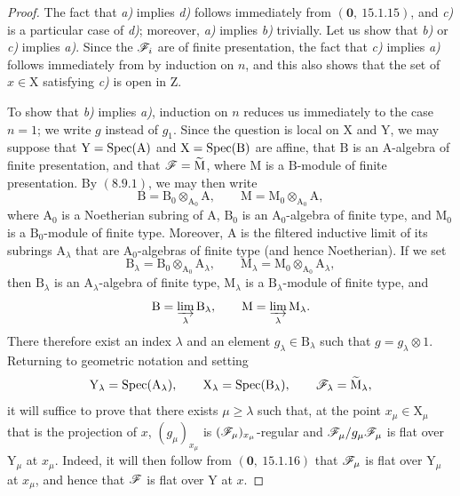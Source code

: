 \begin{proof}
The fact that \emph{a)} implies \emph{d)} follows immediately from $(\mathbf{0},~15.1.15)$, and \emph{c)} is a particular case of \emph{d)}; moreover, \emph{a)} implies \emph{b)} trivially. Let us show that \emph{b)} or \emph{c)} implies \emph{a)}. Since the $\mathscr{F}_i$ are of finite presentation, the fact that \emph{c)} implies \emph{a)} follows immediately from  by induction on $n$, and this also shows that the set of $x\in\mathrm{X}$ satisfying \emph{c)} is open in $\mathrm{Z}$.

To show that \emph{b)} implies \emph{a)}, induction on $n$ reduces us immediately to the case $n=1$; we write $g$ instead of $g_1$. Since the question is local on $\mathrm{X}$ and $\mathrm{Y}$, we may suppose that $\mathrm{Y}=\operatorname{Spec}(\mathrm{A})$ and $\mathrm{X}=\operatorname{Spec}(\mathrm{B})$ are affine, that $\mathrm{B}$ is an $\mathrm{A}$-algebra of finite presentation, and that $\mathscr{F}=\widetilde{\mathrm{M}}$, where $\mathrm{M}$ is a $\mathrm{B}$-module of finite presentation. By $(8.9.1)$, we may then write
\[
  \mathrm{B}=\mathrm{B}_0\otimes_{\mathrm{A}_0}\mathrm{A},
  \qquad
  \mathrm{M}=\mathrm{M}_0\otimes_{\mathrm{A}_0}\mathrm{A},
\]
where $\mathrm{A}_0$ is a Noetherian subring of $\mathrm{A}$, $\mathrm{B}_0$ is an $\mathrm{A}_0$-algebra of finite type, and $\mathrm{M}_0$ is a $\mathrm{B}_0$-module of finite type. Moreover, $\mathrm{A}$ is the filtered inductive limit of its subrings $\mathrm{A}_\lambda$ that are $\mathrm{A}_0$-algebras of finite type (and hence Noetherian). If we set
\[
  \mathrm{B}_\lambda=\mathrm{B}_0\otimes_{\mathrm{A}_0}\mathrm{A}_\lambda,
  \qquad
  \mathrm{M}_\lambda=\mathrm{M}_0\otimes_{\mathrm{A}_0}\mathrm{A}_\lambda,
\]
then $\mathrm{B}_\lambda$ is an $\mathrm{A}_\lambda$-algebra of finite type, $\mathrm{M}_\lambda$ is a $\mathrm{B}_\lambda$-module of finite type, and
\[
  \mathrm{B}=\varinjlim_\lambda\mathrm{B}_\lambda,
  \qquad
  \mathrm{M}=\varinjlim_\lambda\mathrm{M}_\lambda.
\]
There therefore exist an index $\lambda$ and an element $g_\lambda\in\mathrm{B}_\lambda$ such that $g=g_\lambda\otimes 1$. Returning to geometric notation and setting
\[
  \mathrm{Y}_\lambda=\operatorname{Spec}(\mathrm{A}_\lambda),
  \qquad
  \mathrm{X}_\lambda=\operatorname{Spec}(\mathrm{B}_\lambda),
  \qquad
  \mathscr{F}_\lambda=\widetilde{\mathrm{M}}_\lambda,
\]
it will suffice to prove that there exists $\mu\geqslant\lambda$ such that, at the point $x_\mu\in\mathrm{X}_\mu$ that is the projection of $x$, $(g_\mu)_{x_\mu}$ is $(\mathscr{F}_\mu)_{x_\mu}$-regular and $\mathscr{F}_\mu/g_\mu\mathscr{F}_\mu$ is flat over $\mathrm{Y}_\mu$ at $x_\mu$. Indeed, it will then follow from $(\mathbf{0},~15.1.16)$ that $\mathscr{F}_\mu$ is flat over $\mathrm{Y}_\mu$ at $x_\mu$, and hence that $\mathscr{F}$ is flat over $\mathrm{Y}$ at $x$.


\end{proof}
